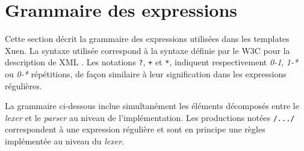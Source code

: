 \chapter{Grammaire des expressions}

Cette section décrit la grammaire des expressions utilisées dans les templates Xuen. La syntaxe utilisée correspond à la syntaxe définie par le W3C pour la description de XML \cite{xml-ebnf}. Les notations \texttt{?}, \texttt{+} et \texttt{*}, indiquent respectivement \emph{0-1}, \emph{1-*} ou \emph{0-*} répétitions, de façon similaire à leur signification dans les expressions régulières.

La grammaire ci-dessous inclue simultanément les éléments décomposés entre le \emph{lexer} et le \emph{parser} au niveau de l'implémentation. Les productions notées \texttt{/.../} correspondent à une expression régulière et sont en principe une règles implémentée au niveau du \emph{lexer}.


